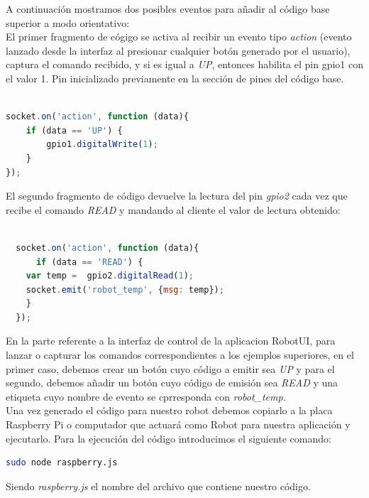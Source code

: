 A continuación mostramos dos posibles eventos para añadir al código base superior a modo orientativo:\\

El primer fragmento de cógigo se activa al recibir un evento tipo \emph{action} (evento lanzado desde la interfaz al presionar cualquier botón generado por el usuario), captura el comando recibido,
y si es igual a \emph{UP}, entonces habilita el pin gpio1 con el valor 1. Pin inicializado previamente en la sección de pines del código base.\\

\begin{lstlisting}[language=JavaScript]

socket.on('action', function (data){
    if (data == 'UP') {
        gpio1.digitalWrite(1);
    }
});

\end{lstlisting}

El segundo fragmento de código devuelve la lectura del pin \emph{gpio2} cada vez que recibe el comando \emph{READ} y mandando al cliente el valor de lectura obtenido:\\

\begin{lstlisting}[language=JavaScript]

  socket.on('action', function (data){
      if (data == 'READ') {
	var temp =  gpio2.digitalRead(1);
	socket.emit('robot_temp', {msg: temp});
    }
  });
\end{lstlisting}
 

En la parte referente a la interfaz de control de la aplicacion RobotUI, para lanzar o capturar los comandos correspondientes a los ejemplos superiores, en el primer caso, debemos crear un botón 
cuyo código a emitir sea \emph{UP} y para el segundo, debemos añadir un botón cuyo código de emisión sea \emph{READ} y una etiqueta cuyo nombre de evento se cprresponda con \emph{robot\_temp}.\\

Una vez generado el código para nuestro robot debemos copiarlo a la placa Raspberry Pi o computador que actuará como Robot para nuestra aplicación y ejecutarlo. Para la ejecución del código
introducimos el siguiente comando:\\

\begin{lstlisting}[language=bash]
  sudo node raspberry.js
\end{lstlisting}

Siendo \emph{raspberry.js} el nombre del archivo que contiene nuestro código.


